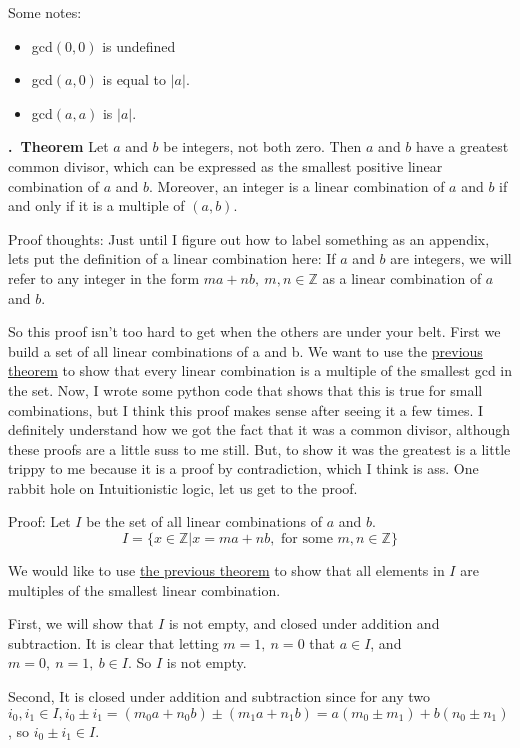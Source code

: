 \documentclass[12pt, oneside]{book}
\newcommand{\Integers}{\mathbb{Z}}
\newcounter{definition}[section]
\renewcommand\thedefinition{\thesection.\arabic{definition}}
\newcommand\define[1]{%
   \refstepcounter{definition}%
   \noindent\textbf{\thedefinition~#1}\label{def:\thedefinition}
}
\begin{document}
Some notes:
\begin{itemize}
	\item gcd\((0, 0)\) is undefined
	\item gcd\((a, 0)\) is equal to \(|a|\).
	\item gcd\((a, a)\) is  \(|a|\).
\end{itemize}

\define{Theorem} Let \(a\) and \(b\) be integers, not both zero. Then \(a\) and \(b\) have a greatest common divisor, which can be expressed as the smallest positive linear combination of \(a\) and \(b\). Moreover, an integer is a linear combination of \(a\) and \(b\) if and only if it is a multiple of \((a, b)\).

Proof thoughts: Just until I figure out how to label something as an appendix, lets put the definition of a linear combination here:  If \(a\) and \(b\) are integers, we will refer to any integer in the form \(ma + nb,\ m, n \in \Integers\) as a linear combination of \(a\) and \(b\).

So this proof isn't too hard to get when the others are under your belt. First we build a set of all linear combinations of a and b. We want to use the \hyperref[def:1.1.4]{previous theorem} to show that every linear combination is a multiple of the smallest gcd in the set. Now, I wrote some python code that shows that this is true for small combinations, but I think this proof makes sense after seeing it a few times. I definitely understand how we got the fact that it was a common divisor, although these proofs are a little suss to me still. But, to show it was the greatest is a little trippy to me because it is a proof by contradiction, which I think is ass. One rabbit hole on Intuitionistic logic, let us get to the proof.

Proof: Let \(I\) be the set of all linear combinations of \(a\) and \(b\).
\[I = \{x \in \Integers | x = ma + nb, \text{ for some } m,n \in \Integers\}\]

We would like to use \hyperref[def:1.1.4]{the previous theorem} to show that all elements in \(I\) are multiples of the smallest linear combination.

First, we will show that \(I\) is not empty, and closed under addition and subtraction. It is clear that letting \(m = 1,\ n = 0\) that \(a \in I\), and \(m = 0,\ n = 1,\ b \in I\). So \(I\) is not empty.

Second, It is closed under addition and subtraction since for any two \(i_0, i_1 \in I, i_0 \pm i_1 = (m_0a + n_0b) \pm (m_1a + n_1b) = a(m_0 \pm m_1) + b(n_0 \pm n_1)\), so \(i_0 \pm i_1 \in I\).
\end{document}

